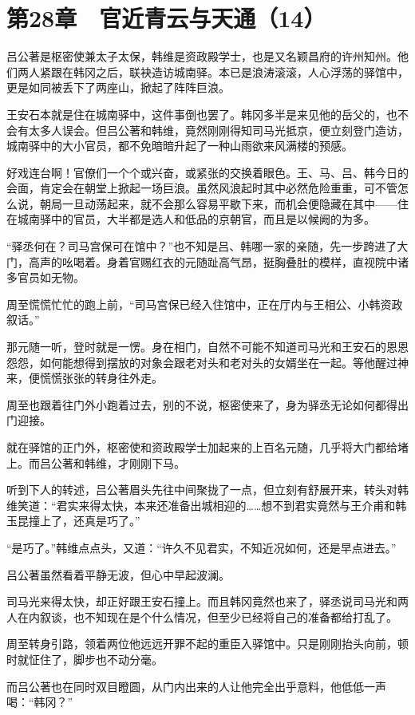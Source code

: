 \section{第28章　官近青云与天通（14）}

吕公著是枢密使兼太子太保，韩维是资政殿学士，也是又名颖昌府的许州知州。他们两人紧跟在韩冈之后，联袂造访城南驿。本已是浪涛滚滚，人心浮荡的驿馆中，更是如同被丢下了两座山，掀起了阵阵巨浪。

王安石本就是住在城南驿中，这件事倒也罢了。韩冈多半是来见他的岳父的，也不会有太多人误会。但吕公著和韩维，竟然刚刚得知司马光抵京，便立刻登门造访，城南驿中的大小官员，都不免暗暗升起了一种山雨欲来风满楼的预感。

好戏连台啊！官僚们一个个或兴奋，或紧张的交换着眼色。王、马、吕、韩今日的会面，肯定会在朝堂上掀起一场巨浪。虽然风浪起时其中必然危险重重，可不管怎么说，朝局一旦动荡起来，就不会那么容易平歇下来，而机会便隐藏在其中——住在城南驿中的官员，大半都是选人和低品的京朝官，而且是以候阙的为多。

“驿丞何在？司马宫保可在馆中？”也不知是吕、韩哪一家的亲随，先一步跨进了大门，高声的吆喝着。身着官赐红衣的元随趾高气昂，挺胸叠肚的模样，直视院中诸多官员如无物。

周至慌慌忙忙的跑上前，“司马宫保已经入住馆中，正在厅内与王相公、小韩资政叙话。”

那元随一听，登时就是一愣。身在相门，自然不可能不知道司马光和王安石的恩恩怨怨，如何能想得到摆放的对象会跟老对头和老对头的女婿坐在一起。等他醒过神来，便慌慌张张的转身往外走。

周至也跟着往门外小跑着过去，别的不说，枢密使来了，身为驿丞无论如何都得出门迎接。

就在驿馆的正门外，枢密使和资政殿学士加起来的上百名元随，几乎将大门都给堵上。而吕公著和韩维，才刚刚下马。

听到下人的转述，吕公著眉头先往中间聚拢了一点，但立刻有舒展开来，转头对韩维笑道：“君实来得太快，本来还准备出城相迎的……想不到君实竟然与王介甫和韩玉昆撞上了，还真是巧了。”

“是巧了。”韩维点点头，又道：“许久不见君实，不知近况如何，还是早点进去。”

吕公著虽然看着平静无波，但心中早起波澜。

司马光来得太快，却正好跟王安石撞上。而且韩冈竟然也来了，驿丞说司马光和两人在内叙谈，也不知现在是个什么情况，但至少已经将自己的准备都给打乱了。

周至转身引路，领着两位他远远开罪不起的重臣入驿馆中。只是刚刚抬头向前，顿时就怔住了，脚步也不动分毫。

而吕公著也在同时双目瞪圆，从门内出来的人让他完全出乎意料，他低低一声喝：“韩冈？”

